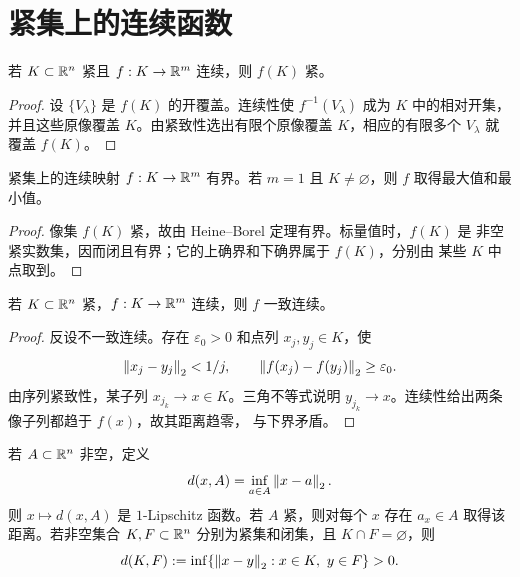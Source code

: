 \section{紧集上的连续函数}

\begin{theorem}[连续像保持紧致]
\label{thm:compact-continuous-image-euclidean}
若 \(K\subset\mathbb{R}^n\) 紧且 \(f:K\to\mathbb{R}^m\) 连续，则 \(f(K)\) 紧。
\end{theorem}

\begin{proof}
设 \(\{V_\lambda\}\) 是 \(f(K)\) 的开覆盖。连续性使
\(f^{-1}(V_\lambda)\) 成为 \(K\) 中的相对开集，并且这些原像覆盖
\(K\)。由紧致性选出有限个原像覆盖 \(K\)，相应的有限多个
\(V_\lambda\) 就覆盖 \(f(K)\)。
\end{proof}

\begin{corollary}[有界性与极值]
\label{cor:continuous-on-euclidean-compact}
紧集上的连续映射 \(f:K\to\mathbb{R}^m\) 有界。若 \(m=1\) 且
\(K\ne\varnothing\)，则 \(f\) 取得最大值和最小值。
\end{corollary}

\begin{proof}
像集 \(f(K)\) 紧，故由 Heine--Borel 定理有界。标量值时，\(f(K)\) 是
非空紧实数集，因而闭且有界；它的上确界和下确界属于 \(f(K)\)，分别由
某些 \(K\) 中点取到。
\end{proof}

\begin{theorem}[紧集上的一致连续性]
\label{thm:heine-cantor-euclidean}
若 \(K\subset\mathbb{R}^n\) 紧，\(f:K\to\mathbb{R}^m\) 连续，则 \(f\) 一致连续。
\end{theorem}

\begin{proof}
反设不一致连续。存在 \(\varepsilon_0>0\) 和点列 \(x_j,y_j\in K\)，使
\[
 \left\lVert x_j-y_j\right\rVert_2<1/j,
 \qquad
 \left\lVert f(x_j)-f(y_j)\right\rVert_2\ge\varepsilon_0.
\]
由序列紧致性，某子列 \(x_{j_k}\to x\in K\)。三角不等式说明
\(y_{j_k}\to x\)。连续性给出两条像子列都趋于 \(f(x)\)，故其距离趋零，
与下界矛盾。
\end{proof}

\begin{proposition}[到集合的距离]
\label{prop:distance-to-set-euclidean}
若 \(A\subset\mathbb{R}^n\) 非空，定义
\[
 d(x,A)=\inf_{a\in A}\left\lVert x-a\right\rVert_2.
\]
则 \(x\mapsto d(x,A)\) 是 \(1\)-Lipschitz 函数。若 \(A\) 紧，则对每个
\(x\) 存在 \(a_x\in A\) 取得该距离。若非空集合 \(K,F\subset\mathbb{R}^n\)
分别为紧集和闭集，且 \(K\cap F=\varnothing\)，则
\[
 d(K,F):=\inf\{\left\lVert x-y\right\rVert_2:x\in K,\ y\in F\}>0.
\]
\end{proposition}

